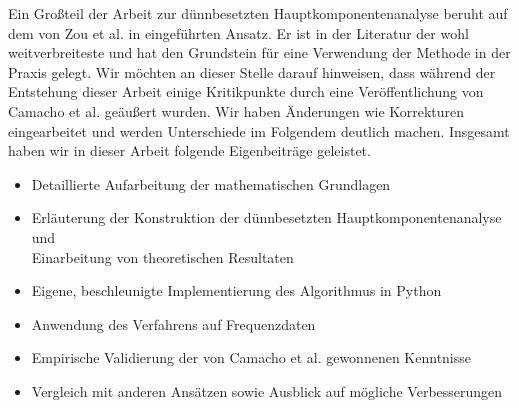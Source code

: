 Ein Großteil der Arbeit zur dünnbesetzten Hauptkomponentenanalyse beruht auf dem von Zou et al. in \cite{zou_sparsepca} eingeführten Ansatz. Er ist in der Literatur der wohl weitverbreiteste und hat den Grundstein für eine Verwendung der Methode in der Praxis gelegt. Wir möchten an dieser Stelle darauf hinweisen, dass während der Entstehung dieser Arbeit einige Kritikpunkte durch eine Veröffentlichung von Camacho et al. \cite{camacho} geäußert wurden. Wir haben Änderungen wie Korrekturen eingearbeitet und werden Unterschiede im Folgendem deutlich machen. Insgesamt haben wir in dieser Arbeit folgende Eigenbeiträge geleistet.
\begin{itemize}
\item Detaillierte Aufarbeitung der mathematischen Grundlagen
\item Erläuterung der Konstruktion der dünnbesetzten Hauptkomponentenanalyse und\\ Einarbeitung von theoretischen Resultaten
\item Eigene, beschleunigte Implementierung des Algorithmus in Python
\item Anwendung des Verfahrens auf Frequenzdaten
\item Empirische Validierung der von Camacho et al. gewonnenen Kenntnisse
\item Vergleich mit anderen Ansätzen sowie Ausblick auf mögliche Verbesserungen
\end{itemize}